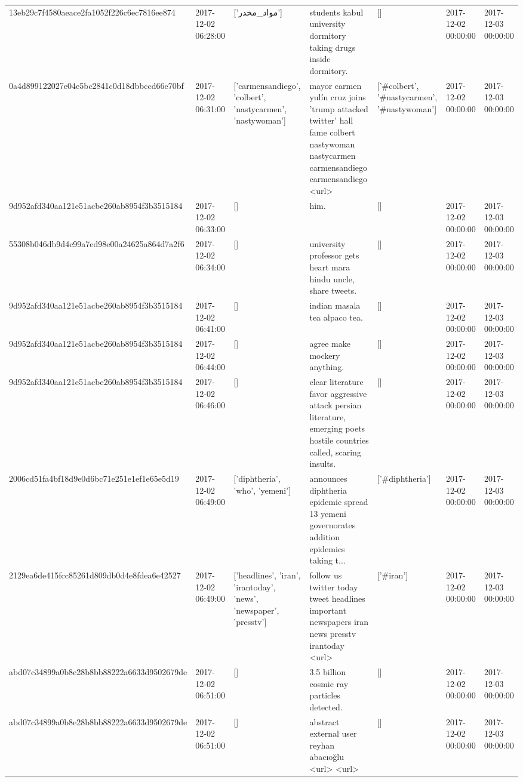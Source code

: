 \begin{tabular}{lllllll}
13eb29c7f4580aeace2fa1052f226c6ec7816ee874 & 2017-12-02 06:28:00 & ['مواد_مخدر'] & students kabul university dormitory taking drugs inside dormitory. & [] & 2017-12-02 00:00:00 & 2017-12-03 00:00:00 \\
0a4d899122027e04e5bc2841c0d18dbbccd66e70bf & 2017-12-02 06:31:00 & ['carmensandiego', 'colbert', 'nastycarmen', 'nastywoman'] & mayor carmen yulín cruz joins 'trump attacked twitter' hall fame colbert nastywoman nastycarmen carmensandiego carmensandiego <url> & ['#colbert', '#nastycarmen', '#nastywoman'] & 2017-12-02 00:00:00 & 2017-12-03 00:00:00 \\
9d952afd340aa121e51acbe260ab8954f3b3515184 & 2017-12-02 06:33:00 & [] & him. & [] & 2017-12-02 00:00:00 & 2017-12-03 00:00:00 \\
55308b046db9d4c99a7ed98e00a24625a864d7a2f6 & 2017-12-02 06:34:00 & [] & university professor gets heart mara hindu uncle, share tweets. & [] & 2017-12-02 00:00:00 & 2017-12-03 00:00:00 \\
9d952afd340aa121e51acbe260ab8954f3b3515184 & 2017-12-02 06:41:00 & [] & indian masala tea alpaco tea. & [] & 2017-12-02 00:00:00 & 2017-12-03 00:00:00 \\
9d952afd340aa121e51acbe260ab8954f3b3515184 & 2017-12-02 06:44:00 & [] & agree make mockery anything. & [] & 2017-12-02 00:00:00 & 2017-12-03 00:00:00 \\
9d952afd340aa121e51acbe260ab8954f3b3515184 & 2017-12-02 06:46:00 & [] & clear literature favor aggressive attack persian literature, emerging poets hostile countries called, scaring insults. & [] & 2017-12-02 00:00:00 & 2017-12-03 00:00:00 \\
2006cd51fa4bf18d9e0d6bc71e251e1ef1e65e5d19 & 2017-12-02 06:49:00 & ['diphtheria', 'who', 'yemeni'] & announces diphtheria epidemic spread 13 yemeni governorates addition epidemics taking t... & ['#diphtheria'] & 2017-12-02 00:00:00 & 2017-12-03 00:00:00 \\
2129ea6de415fcc85261d809db0d4e8fdea6e42527 & 2017-12-02 06:49:00 & ['headlines', 'iran', 'irantoday', 'news', 'newspaper', 'presstv'] & follow us twitter today tweet headlines important newspapers iran news presstv irantoday <url> & ['#iran'] & 2017-12-02 00:00:00 & 2017-12-03 00:00:00 \\
abd07c34899a0b8e28b8bb88222a6633d9502679de & 2017-12-02 06:51:00 & [] & 3.5 billion cosmic ray particles detected. & [] & 2017-12-02 00:00:00 & 2017-12-03 00:00:00 \\
abd07c34899a0b8e28b8bb88222a6633d9502679de & 2017-12-02 06:51:00 & [] & abstract external user reyhan abacıoğlu <url> <url> & [] & 2017-12-02 00:00:00 & 2017-12-03 00:00:00 \\

\end{tabular}
